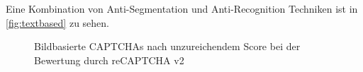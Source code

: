 Eine Kombination von Anti-Segmentation und Anti-Recognition Techniken ist in \autoref{fig:textbased} zu sehen.

\begin{figure}[h!]
    \centering
    \qquad
    \caption{Bildbasierte CAPTCHAs nach unzureichendem Score bei der Bewertung durch reCAPTCHA v2}   
    \label{fig:selectionbased}
\end{figure}

